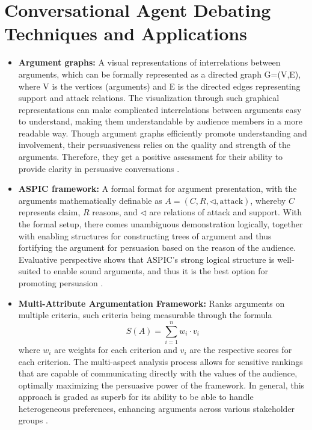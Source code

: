 \documentclass[conference]{IEEEtran}
\begin{document}
\section{Conversational Agent Debating Techniques and Applications}
\begin{itemize}
    \item \textbf{Argument graphs:} A visual representations of interrelations between arguments, which can be formally represented as a directed graph G=(V,E), where V is the vertices (arguments) and E is the directed edges representing support and attack relations. The visualization through such graphical representations can make complicated interrelations between arguments easy to understand, making them understandable by audience members in a more readable way. Though argument graphs efficiently promote understanding and involvement, their persuasiveness relies on the quality and strength of the arguments. Therefore, they get a positive assessment for their ability to provide clarity in persuasive conversations \cite{b4}\cite{b6}.

    \item \textbf{ASPIC framework:} A formal format for argument presentation, with the arguments mathematically definable as \( A = (C,R,\lhd ,\text{attack}) \), whereby \( C \) represents claim, \( R \) reasons, and \( \lhd \) are relations of attack and support. With the formal setup, there comes unambiguous demonstration logically, together with enabling structures for constructing trees of argument and thus fortifying the argument for persuasion based on the reason of the audience. Evaluative perspective shows that ASPIC's strong logical structure is well-suited to enable sound arguments, and thus it is the best option for promoting persuasion \cite{b6}.

    \item \textbf{Multi-Attribute Argumentation Framework:} 
    Ranks arguments on multiple criteria, such criteria being measurable through the formula 
    \[
    S(A) = \sum_{i=1}^{n} w_i \cdot v_i
    \]
    where \( w_i \) are weights for each criterion and \( v_i \) are the respective scores for each criterion. The multi-aspect analysis process allows for sensitive rankings that are capable of communicating directly with the values of the audience, optimally maximizing the persuasive power of the framework. In general, this approach is graded as superb for its ability to be able to handle heterogeneous preferences, enhancing arguments across various stakeholder groups \cite{b6}.
    
\end{itemize}
\end{document}
